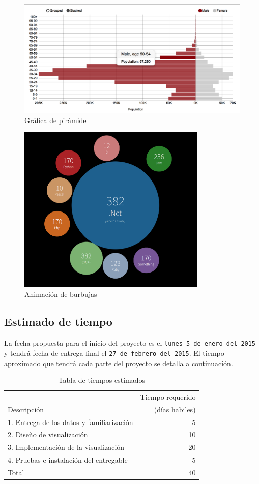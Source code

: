 \documentclass[11pt,letterpaper,spanish]{article}
\begin{document}
\begin{figure}[H]
\caption{Gráfica de pirámide}
\centering
\includegraphics[width=150mm]{../img/piramide.png}
\end{figure}

\begin{figure}[H]
\caption{Animación de burbujas}
\centering
\includegraphics[width=90mm]{../img/burbujas.png}
\end{figure}

\newpage

\subsection*{Estimado de tiempo}

La fecha propuesta para el inicio del proyecto es el \texttt{lunes 5 de enero del 2015} y tendrá fecha de entrega final el \texttt{27 de febrero del 2015}. El tiempo aproximado que tendrá cada parte del proyecto se detalla a continuación.



\begin{table}[H]
\caption{Tabla de tiempos estimados}
\centering
\begin{tabular}{lr}
\hline
& Tiempo requerido \\
Descripción & (días habiles)\\
\hline
1. Entrega de los datos y familiarización & 5\\
2. Diseño de visualización & 10\\
3. Implementación de la visualización & 20\\
4. Pruebas e instalación del entregable  & 5 \\
\hline
Total & 40\\
\hline
\end{tabular}
\end{table}
\end{document}
